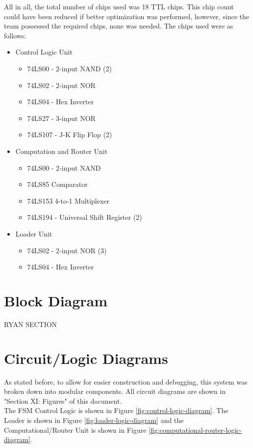 \documentclass[journal, twocolumn, final,11pt,letterpaper]{IEEEtran}
\begin{document}
All in all, the total number of chips used was 18 TTL chips. This chip count could have been reduced if better optimization was performed, however, since the team possessed the required chips, none was needed. The chips used were as follows:
\begin{itemize}
	\item Control Logic Unit
	\begin{itemize}
		\item 74LS00 - 2-input NAND (2)
		\item 74LS02 - 2-input NOR
		\item74LS04 - Hex Inverter
		\item 74LS27 - 3-input NOR
		\item 74LS107 - J-K Flip Flop (2)
	\end{itemize}
	\item Computation and Router Unit
	\begin{itemize}
		\item 74LS00 - 2-input NAND
		\item 74LS85 Comparator
		\item 74LS153 4-to-1 Multiplexer
		\item 74LS194 - Universal Shift Register (2)
	\end{itemize}
	\item Loader Unit
	\begin{itemize}
		\item 74LS02 - 2-input NOR (3)
		\item 74LS04 - Hex Inverter 
	\end{itemize}
\end{itemize}
\section{Block Diagram} 
RYAN SECTION

 
\section{Circuit/Logic Diagrams}
As stated before, to allow for easier  construction and debugging, this system was broken down into modular components. All circuit diagrams are shown in "Section XI: Figures" of this document.\\
 
The FSM Control Logic is shown in Figure \ref{fig:control-logic-diagram}. The Loader is shown in Figure \ref{fig:loader-logic-diagram} and the Computational/Router Unit is shown in Figure \ref{fig:computational-router-logic-diagram}.   
 
\end{document}
